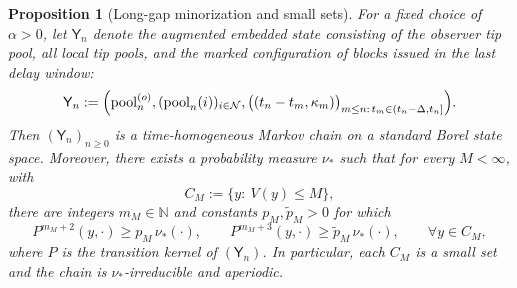 \documentclass[a4paper,12pt,oneside,reqno]{amsart}
\newcommand{\Nodes}{{\mathcal N}}
\newcommand{\N}{{\mathbb N}}
\newcommand{\1}{{\mathbf 1}}
\newcommand{\pool}{\mathrm{pool}}
\newtheorem{prop}[theo]{Proposition}
\begin{document}
\begin{prop}[Long-gap minorization and small sets]\label{prop:small-set-poisson}
For a fixed choice of $\alpha>0$, let $\mathsf{Y}_n$ denote the augmented embedded state consisting of the observer tip pool, all local tip pools, and the marked configuration of blocks issued in the last delay window:
\[
   \mathsf{Y}_n
   :=
   \Bigl(
      \pool_n^{(o)},
      (\pool_n(i))_{i\in\Nodes},
      \bigl((t_n-t_m,\kappa_m)\bigr)_{m\le n:\, t_m\in(t_n-\Delta,t_n]}
   \Bigr).
\]
Then $(\mathsf{Y}_n)_{n\ge0}$ is a time-homogeneous Markov chain on a standard Borel state space. Moreover, there exists a probability measure $\nu_\ast$ such that for every $M<\infty$, with
\[
   C_M:=\{y:\ V(y)\le M\},
\]
there are integers $m_M\in\N$ and constants $p_M,\widetilde p_M>0$ for which
\[
   P^{m_M+2}(y,\cdot)\ge p_M\,\nu_\ast(\cdot),
   \qquad
   P^{m_M+3}(y,\cdot)\ge \widetilde p_M\,\nu_\ast(\cdot),
   \qquad \forall y\in C_M,
\]
where $P$ is the transition kernel of $(\mathsf{Y}_n)$. In particular, each $C_M$ is a small set and the chain is $\nu_\ast$-irreducible and aperiodic.
\end{prop}
\end{document}
